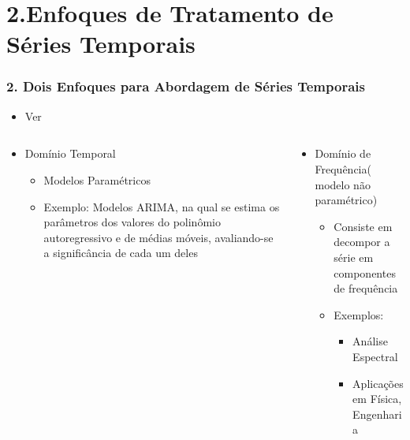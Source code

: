 \documentclass{beamer}
\begin{document}
	\section{2.Enfoques de Tratamento de Séries Temporais}
	\begin{frame}
		\frametitle{2. Dois Enfoques para Abordagem de Séries Temporais}
		\begin{itemize}
			\item   Ver \cite{morettin2018analise,hamilton2020time,enders2008applied,shumway2000time}
		\end{itemize}
		\begin{columns}
			\begin{column}{0.5\textwidth}
				\begin{itemize}
					\item<1-> Domínio Temporal 
					\begin{itemize}
						\item<1-> Modelos Paramétricos
						\item<1-> Exemplo: Modelos ARIMA, na qual se estima os parâmetros dos valores do polinômio autoregressivo e de médias móveis, avaliando-se a significância de cada um deles				
					\end{itemize}
				\end{itemize}
			\end{column}
					   
		    \begin{column}{0.5\textwidth}
		    \begin{itemize}
		    	\item<1-> Domínio de Frequência( modelo não paramétrico)
		    	\begin{itemize}
		    		\item<1-> Consiste em decompor a série em componentes de frequência
		    		\item<1-> Exemplos:
		    		\begin{itemize}
		    			\item<1-> Análise Espectral
		    			\item<1->Aplicações em Física, Engenharia
		    		\end{itemize}	
		    	\end{itemize}
		    \end{itemize} 
		    \end{column}
	    
		\end{columns}	
	
	\end{frame}
\end{document}
